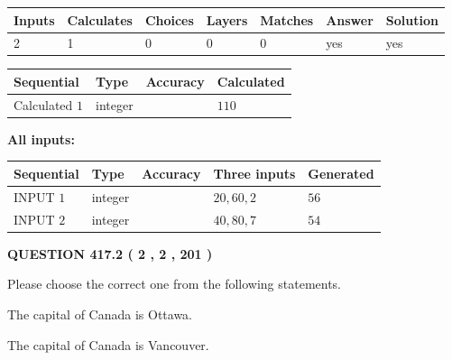 \documentclass[12pt]{article}
\begin{document}
   
   
   
\noindent\begin{tabular}{|l|l|l|l|l|l|l|}
 \hline
Inputs & Calculates & Choices & Layers & Matches & Answer & Solution \\ \hline
 2  & 
 1  & 
 0
  & 
 0  & 
 0  & 
  yes & 
  yes 
  \\ \hline
 \end{tabular}
   
   
   
   
\noindent{}
   
   
  
  
\noindent\begin{tabular}{|l|l|l|l|}
\hline
 Sequential & Type & Accuracy & Calculated \\ 
\hline
 
 
  Calculated $  1 $ & integer &  & 
  $ 110 $ 
 \\  \hline  
 \end{tabular}
   
   
   
   
\noindent\vspace{0.1in}\hspace{-0.08in} {\textbf{\Large{All inputs: }}}
   
   
  
  
\noindent\begin{tabular}{|l|l|l|l|l|}
\hline
 Sequential & Type & Accuracy & Three inputs & Generated \\ 
\hline
 
 
  INPUT $  1 $ & integer &  & $
 20
 , 
 60
 , 
 2
 $ & $ 56 $ 
 \\  \hline  
 
 
  INPUT $  2 $ & integer &  & $
 40
 , 
 80
 , 
 7
 $ & $ 54 $ 
 \\  \hline  
 \end{tabular}
   
   
  
\vspace{0.2in}
  
{\textbf{\Large{QUESTION
417.2 
 ( 2 , 2 , 201 )
}}}
  
  
Please choose the correct one from the following statements.
 
 
The capital of Canada is Ottawa.
 
 
The capital of Canada is Vancouver.
 
\end{document}

